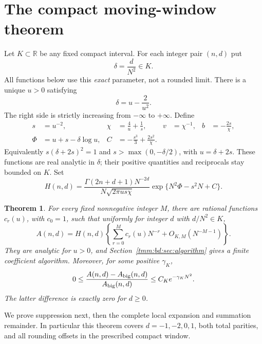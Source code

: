 \documentclass[11pt,letterpaper]{article}
\newtheorem{theorem}{Theorem}[section]
\theoremstyle{remark}\newtheorem{remark}[theorem]{Remark}
\begin{document}
\section{The compact moving-window theorem}\label{tmm:bd:sec:window}
Let $K\subset\mathbb R$ be any fixed compact interval. For each integer pair $(n,d)$ put
\[
 \delta=\frac d{N^2}\in K.
\]
All functions below use this \emph{exact} parameter, not a rounded limit. There is a unique $u>0$ satisfying
\begin{equation}\label{tmm:bd:eq:u}
 \delta=u-\frac2{u^2}.
\end{equation}
The right side is strictly increasing from $-\infty$ to $+\infty$. Define
\begin{align}
 s&=u^{-2},&\chi&=\frac4u+\frac1s,&v&=\chi^{-1},&b&=-\frac{2s}{\chi},\label{tmm:bd:eq:params}\\
 \Phi&=u+s-\delta\log u,& C&=-\frac{s^3}3+\frac{2s^2}{\chi}.&&\label{tmm:bd:eq:phase}
\end{align}
Equivalently $s(\delta+2s)^2=1$ and $s>\max(0,-\delta/2)$, with $u=\delta+2s$. These functions are real analytic in $\delta$; their positive quantities and reciprocals stay bounded on $K$. Set
\begin{equation}\label{tmm:bd:eq:H}
 H(n,d)=\frac{\Gamma(2n+d+1)N^{-2d}}
 {N\sqrt{2\pi us\chi}}\exp\{N^2\Phi-s^2N+C\}.
\end{equation}

\begin{theorem}\label{tmm:bd:thm:window}
For every fixed nonnegative integer $M$, there are rational functions $c_r(u)$, with $c_0=1$, such that uniformly for integer $d$ with $d/N^2\in K$,
\begin{equation}\label{tmm:bd:eq:window}
 A(n,d)=H(n,d)\left\{\sum_{r=0}^Mc_r(u)N^{-r}
                    +O_{K,M}(N^{-M-1})\right\}.
\end{equation}
They are analytic for $u>0$, and Section~\ref{tmm:bd:sec:algorithm} gives a finite coefficient algorithm. Moreover, for some positive $\gamma_K$,
\begin{equation}\label{tmm:bd:eq:suppress}
 0\le\frac{A(n,d)-A_{\rm big}(n,d)}{A_{\rm big}(n,d)}
 \le C_K e^{-\gamma_KN^2}.
\end{equation}
The latter difference is exactly zero for $d\ge0$.
\end{theorem}
We prove suppression next, then the complete local expansion and summation remainder. In particular this theorem covers $d=-1,-2,0,1$, both total parities, and all rounding offsets in the prescribed compact window.
\end{document}
